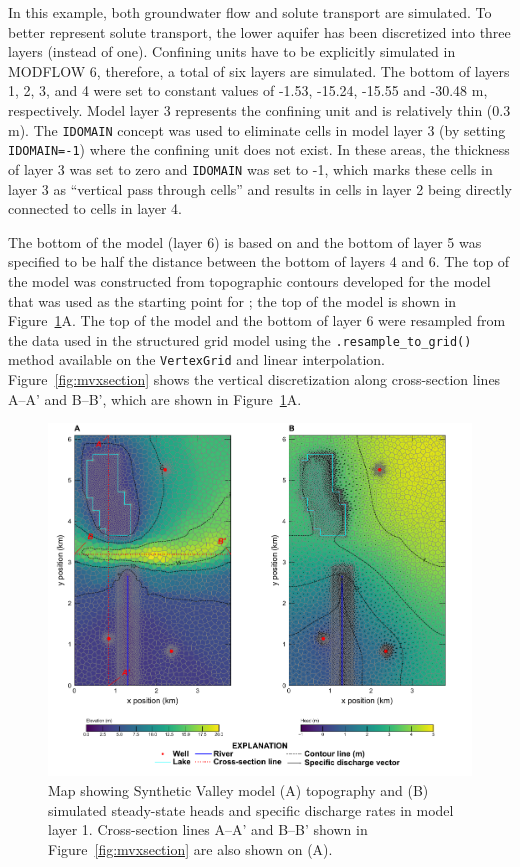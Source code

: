\documentclass[12pt, oneside]{article}  	%
\begin{document}
In this example, both groundwater flow \citep{modflow6gwf} and solute transport \citep{modflow6gwt} are simulated. To better represent solute transport, the lower aquifer has been discretized into three layers (instead of one). Confining units have to be explicitly simulated in MODFLOW 6, therefore, a total of six layers are simulated. The bottom of layers 1, 2, 3, and 4 were set to constant values of -1.53, -15.24, -15.55 and -30.48 m, respectively. Model layer 3 represents the confining unit and is relatively thin (0.3 m). The \texttt{IDOMAIN} concept \citep{modflow6gwf} was used to eliminate cells in model layer 3 (by setting \texttt{IDOMAIN=-1}) where the confining unit does not exist. In these areas, the thickness of layer 3 was set to zero and \texttt{IDOMAIN} was set to -1, which marks these cells in layer 3 as ``vertical pass through cells'' and results in cells in layer 2 being directly connected to cells in layer 4. 

The bottom of the model (layer 6) is based on \cite{hill1998} and the bottom of layer 5 was specified to be half the distance between the bottom of layers 4 and 6. The top of the model was constructed from topographic contours developed for the model that was used as the starting point for \cite{hill1998} \citep{pollock2014percomm}; the top of the model is shown in Figure~\ref{fig:mvmap}A. The top of the model and the bottom of layer 6 were resampled from the data used in the structured grid model using the \texttt{.resample\_to\_grid()} method available on the \texttt{VertexGrid} and linear interpolation. Figure~\ref{fig:mvxsection} shows the vertical discretization along cross-section lines A--A' and B--B', which are shown in Figure~\ref{fig:mvmap}A.

\begin{figure}[ht!]
	\begin{center}
		\includegraphics{figure6.pdf}
	\end{center}
	\caption{Map showing Synthetic Valley model (A) topography and (B) simulated steady-state heads and specific discharge rates in model layer 1. Cross-section lines A--A' and B--B' shown in Figure~\ref{fig:mvxsection} are also shown on (A).}
	\label{fig:mvmap}
\end{figure}
\end{document}

